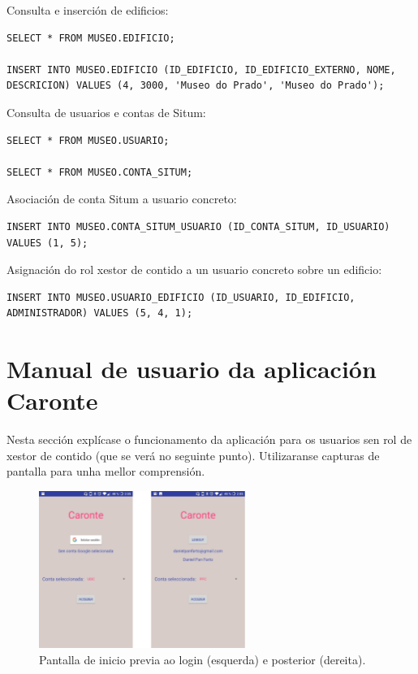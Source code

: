 Consulta e inserción de edificios:
\begin{lstlisting}
SELECT * FROM MUSEO.EDIFICIO;

INSERT INTO MUSEO.EDIFICIO (ID_EDIFICIO, ID_EDIFICIO_EXTERNO, NOME, DESCRICION) VALUES (4, 3000, 'Museo do Prado', 'Museo do Prado');
\end{lstlisting}

Consulta de usuarios e contas de Situm:
\begin{lstlisting}
SELECT * FROM MUSEO.USUARIO;

SELECT * FROM MUSEO.CONTA_SITUM;
\end{lstlisting}

Asociación de conta Situm a usuario concreto:
\begin{lstlisting}
INSERT INTO MUSEO.CONTA_SITUM_USUARIO (ID_CONTA_SITUM, ID_USUARIO) VALUES (1, 5);
\end{lstlisting}

Asignación do rol xestor de contido a un usuario concreto sobre un edificio:
\begin{lstlisting}
INSERT INTO MUSEO.USUARIO_EDIFICIO (ID_USUARIO, ID_EDIFICIO, ADMINISTRADOR) VALUES (5, 4, 1);
\end{lstlisting}


\section{Manual de usuario da aplicación Caronte}
Nesta sección explícase o funcionamento da aplicación para os usuarios sen rol de xestor de contido (que se verá no seguinte punto). Utilizaranse capturas de pantalla para unha mellor comprensión.

\begin{figure}[h]
	\begin{center}
		\includegraphics[width=0.6\textwidth]{figures/android/capturaInicio}
		\caption{Pantalla de inicio previa ao login (esquerda) e posterior (dereita).}
		\label{fig:capturaInicio}
	\end{center}
\end{figure}

